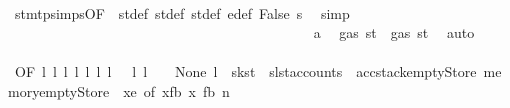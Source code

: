 \begin{isabellebody}
\ \ \ \ \ \ \ \ \ \ \ \ \ \ \ \ \ \ \ \ \ \ \ \ \ \ \ \ \ \ \ \ \ \ \ \ \ \ \ \ \ \ \ \ \isamarkupfalse%
\ stmt{\isachardot}{\kern0pt}psimps{\isacharparenleft}{\kern0pt}{}{\isacharparenright}{\kern0pt}{\isacharbrackleft}{\kern0pt}OF\ {}{\isacharparenleft}{\kern0pt}{}{\isacharparenright}{\kern0pt}{\isacharbrackright}{\kern0pt}\ st{\isacharprime}{\kern0pt}{\isacharunderscore}{\kern0pt}def\ st{\isacharprime}{\kern0pt}{\isacharprime}{\kern0pt}{\isacharunderscore}{\kern0pt}def\ st{\isacharprime}{\kern0pt}{\isacharprime}{\kern0pt}{\isacharprime}{\kern0pt}{\isacharunderscore}{\kern0pt}def\ e{\isacharprime}{\kern0pt}{\isacharunderscore}{\kern0pt}def\ False\ s{}\ \isamarkupfalse%
\ simp\isanewline
\ \ \ \ \ \ \ \ \ \ \ \ \ \ \ \ \ \ \ \ \ \ \ \ \ \ \ \ \ \ \ \ \ \ \ \ \ \ \ \ \ \ \isamarkupfalse%
\ a{}\ \isamarkupfalse%
\ {\isachardoublequoteopen}gas\ st{}{\isacharprime}{\kern0pt}\ {\isasymle}\ gas\ st{\isacharprime}{\kern0pt}{\isacharprime}{\kern0pt}{\isacharprime}{\kern0pt}{\isacharprime}{\kern0pt}{\isachardoublequoteclose}\ \isamarkupfalse%
\ auto\isanewline
\ \ \ \ \ \ \ \ \ \ \ \ \ \ \ \ \ \ \ \ \ \ \ \ \ \ \ \ \ \ \ \ \ \ \ \ \ \ \ \ \ \ \isamarkupfalse%
\ \isamarkupfalse%
\ {}{\isacharparenleft}{\kern0pt}{}{\isacharparenright}{\kern0pt}{\isacharbrackleft}{\kern0pt}OF\ l{}\ l{}\ l{}\ l{}\ l{}\ l{}\ l{}\ {\isacharunderscore}{\kern0pt}\ {\isacharunderscore}{\kern0pt}\ l{}\ l{}\ {\isacharunderscore}{\kern0pt}\ {\isacharunderscore}{\kern0pt}\ {\isacharunderscore}{\kern0pt}\ None\ l{}{}{\isacharcomma}{\kern0pt}\ \ {\isacharquery}{\kern0pt}s{\isacharprime}{\kern0pt}k{\isacharequal}{\kern0pt}{\isachardoublequoteopen}st{\isacharprime}{\kern0pt}{\isacharprime}{\kern0pt}{\isacharprime}{\kern0pt}{\isachardoublequoteclose}\ \ {\isacharquery}{\kern0pt}s{\isacharprime}{\kern0pt}l{\isacharequal}{\kern0pt}{\isachardoublequoteopen}st{\isacharprime}{\kern0pt}{\isacharprime}{\kern0pt}{\isacharprime}{\kern0pt}{\isasymlparr}accounts\ {\isacharcolon}{\kern0pt}{\isacharequal}{\kern0pt}\ acc{\isacharcomma}{\kern0pt}stack{\isacharcolon}{\kern0pt}{\isacharequal}{\kern0pt}emptyStore{\isacharcomma}{\kern0pt}\ memory{\isacharcolon}{\kern0pt}{\isacharequal}{\kern0pt}emptyStore{\isasymrparr}{\isachardoublequoteclose}\ \ {\isacharquery}{\kern0pt}x{\isacharequal}{\kern0pt}e{\isacharprime}{\kern0pt}{\isacharcomma}{\kern0pt}\ of\ {\isachardoublequoteopen}{\isacharparenleft}{\kern0pt}x{}{\isacharcomma}{\kern0pt}fb{\isacharparenright}{\kern0pt}{\isachardoublequoteclose}\ x{}\ fb{\isacharbrackright}{\kern0pt}\ n{}\ \isanewline

\end{isabellebody}
